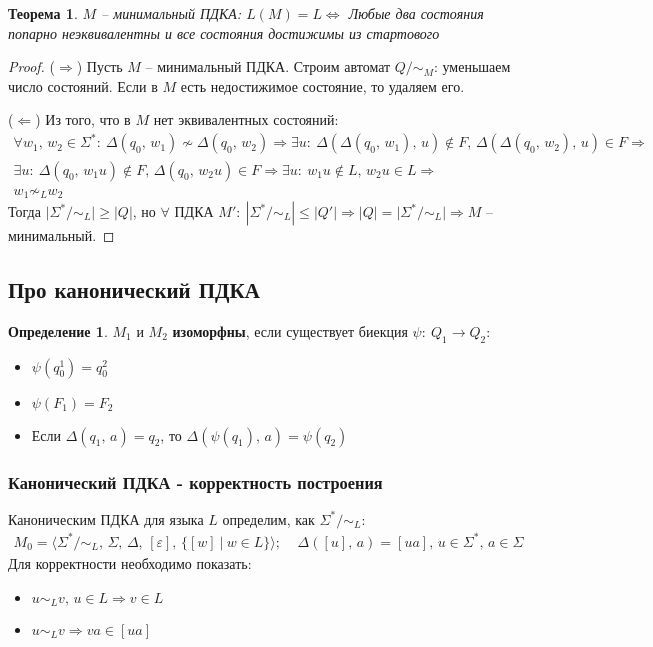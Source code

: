 \documentclass[a4paper,12pt]{article}
\renewcommand{\leq}{\ensuremath{\leqslant}}
\renewcommand{\geq}{\ensuremath{\geqslant}}
\theoremstyle{plain}
\newtheorem{theorem}{Теорема}[subsection]
\theoremstyle{definition}
\newtheorem{definition}{Определение}[subsection]
\theoremstyle{remark}
\begin{document}
\begin{theorem}
	$M$ -- минимальный ПДКА: $L(M) = L \Leftrightarrow$ Любые два состояния попарно неэквивалентны и все состояния достижимы из стартового
\end{theorem}

\begin{proof}
	($\Rightarrow$) Пусть $M$ -- минимальный ПДКА. Строим автомат $Q / \sim_M$: уменьшаем число состояний. Если в $M$ есть недостижимое состояние, то удаляем его.

	($\Leftarrow$) Из того, что в $M$ нет эквивалентных состояний:
	\begin{align*}
		\forall w_1,\, w_2 \in \Sigma^* :\: \Delta(q_0,\, w_1) \not\sim \Delta(q_0,\, w_2) \Rightarrow \exists u :\: \Delta(\Delta(q_0,\, w_1),\, u) \not\in F,\, \Delta(\Delta(q_0,\, w_2),\, u) \in F \Rightarrow \\
		\exists u :\: \Delta(q_0,\, w_1u) \not\in F,\, \Delta(q_0,\, w_2u) \in F \Rightarrow \exists u :\: w_1u \not\in L,\, w_2u \in L \Rightarrow                                                                 \\ w_1 \not\sim_L w_2
	\end{align*}
	Тогда $\vert\Sigma^*/\sim_L\vert \geq \vert Q\vert$, но $\forall$ ПДКА $M' :\: |\Sigma^*/\sim_L| \leq |Q'| \Rightarrow \vert Q\vert = \vert\Sigma^*/\sim_L\vert \Rightarrow M$ -- минимальный.
\end{proof}

\subsection{Про канонический ПДКА}
\begin{definition}
	$M_1$ и $M_2$ \textbf{изоморфны}, если существует биекция $\psi:\: Q_1 \to Q_2$:
	\begin{itemize}
		\item $\psi(q_0^1) = q_0^2$
		\item $\psi(F_1) = F_2$
		\item Если $\Delta(q_1,\, a) = q_2$, то $\Delta(\psi(q_1),\,a) = \psi(q_2)$
	\end{itemize}
\end{definition}

\subsubsection*{Канонический ПДКА - корректность построения}
Каноническим ПДКА для языка $L$ определим, как $\Sigma^* / \sim_L$:
\begin{align*}
	M_0 = \langle\Sigma^*/\sim_L,\,\Sigma,\,\Delta,\, [\varepsilon],\,\{[w] \:|\: w \in L\} \rangle ;\;\;\;\; \Delta([u],\,a) = [ua],\, u \in \Sigma^*,\, a \in \Sigma
\end{align*}
Для корректности необходимо показать:
\begin{itemize}
	\item $u \sim_L v,\, u \in L \Rightarrow v \in L$
	\item $u \sim_L v \Rightarrow va \in [ua]$
\end{itemize}
\end{document}
